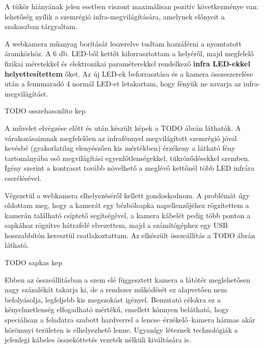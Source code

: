 A tükör hiányának jelen esetben viszont maximálisan pozitív következménye van: lehetőség nyílik a szemrégió infra-megvilágítására, amelynek előnyeit a  szakaszban tárgyaltam.

\bigskip

A webkamera műanyag borítását leszerelve tudtam hozzáférni a nyomtatott áramkörhöz. A 6 db. LED-ből kettőt kiforrasztottam a helyéről, majd megfelelő fizikai méretekkel és elektronikai paraméterekkel rendelkező \textbf{infra LED-ekkel helyettesítettem} őket. Az új LED-ek beforrasztása és a kamera összeszerelése után a fennmaradó 4 normál LED-et letakartam, hogy fényük ne zavarja az infra-megvilágítást.

TODO osszehasonlito kep

A művelet elvégzése előtt és után készült képek a TODO ábrán láthatók. A várakozásaimnak megfelelően az infrafénnyel megvilágított szemrégió jóval kevésbé (gyakorlatilag elenyészően kis mértékben) érzékeny a látható fény tartományába eső megvilágítási egyenlőtlenségekkel, tükröződésekkel szemben. Igény szerint a kontraszt tovább növelhető a meglévő kettőnél több LED infrára cserélésével.

\bigskip

Végezetül a webkamera elhelyezéséről kellett gondoskodnom. A problémát úgy oldottam meg, hogy a kamerát egy bézbólsapka napellenzőjéhez rögzítettem a kamerán található csíptető segítségével, a kamera kábelét pedig több ponton a sapkához rögzítve hátrafelé elvezettem, majd a számítógéphez egy USB hosszabbítón keresztül csatlakoztattam. Az elkészült összeállítás a TODO ábrán látható.

TODO sapkas kep

Ebben az összeállításban a szem elé függesztett kamera a látótér meglehetősen nagy százalékát takarja ki, de a rendszer működését ez alapvetően nem befolyásolja, legfeljebb kis megszokást igényel. Bemutató célokra ez a kényelmetlenség elfogadható mértékű, emellett könnyen belátható, hogy speciálisan a feladatra szabott hardverrel a lencse--érzékelő--kamera hármas akár körömnyi területen is elhelyezhető lenne. Ugyanígy léteznek technológiák a jelenlegi kábeles összeköttetés vezeték nélküli kiváltására is.